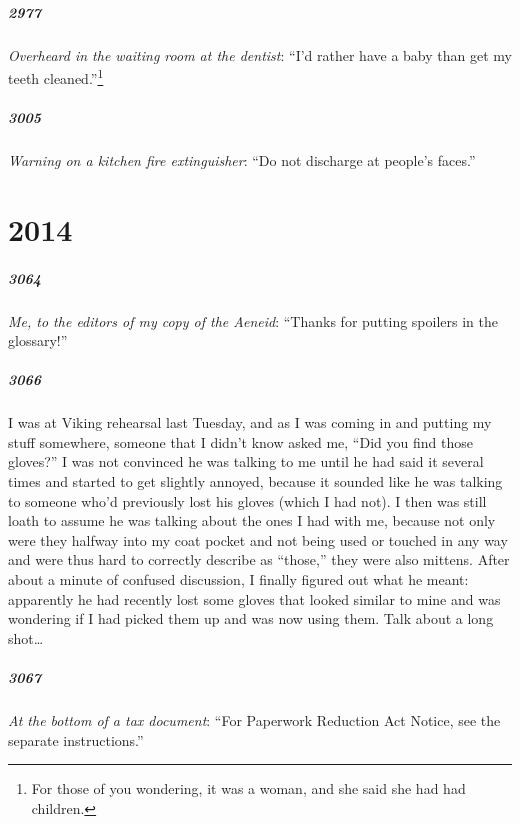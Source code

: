 \documentclass[10pt]{memoir}
\newcommand{\intro}[1]{\emph{#1}}
\begin{document}
\paragraph{2977} \intro{Overheard in the waiting room at the dentist}: ``I'd rather have a baby than get my teeth cleaned.''\thinspace\footnote{For those of you wondering, it was a woman, and she said she had had children.}

\paragraph{3005} \intro{Warning on a kitchen fire extinguisher}: ``Do not discharge at people's faces.''

\chapter{2014}
\paragraph{3064} \intro{Me, to the editors of my copy of the \emph{Aeneid}}: ``Thanks for putting spoilers in the glossary!''

\paragraph{3066} I was at Viking rehearsal last Tuesday, and as I was coming in and putting my stuff somewhere, someone that I didn't know asked me, ``Did you find those gloves?'' I was not convinced he was talking to me until he had said it several times and started to get slightly annoyed, because it sounded like he was talking to someone who'd previously lost his gloves (which I had not). I then was still loath to assume he was talking about the ones I had with me, because not only were they halfway into my coat pocket and not being used or touched in any way and were thus hard to correctly describe as ``those,'' they were also mittens. After about a minute of confused discussion, I finally figured out what he meant: apparently he had recently lost some gloves that looked similar to mine and was wondering if I had picked them up and was now using them. Talk about a long shot\ldots

\paragraph{3067} \intro{At the bottom of a tax document}: ``For Paperwork Reduction Act Notice, see the separate instructions.''
\end{document}
